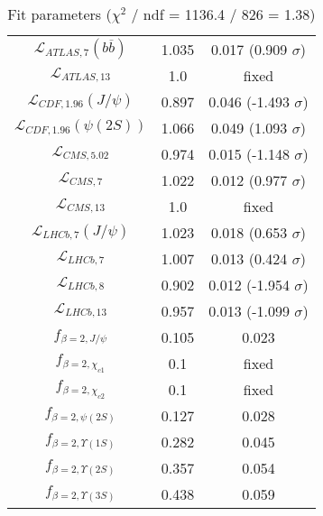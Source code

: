 \begin{table}[h!]
\begin{tabular}{c|c|c}
$\mathcal L_{ATLAS,7}(b\overline b)$ & 1.035 & 0.017 (0.909 $\sigma$) \\
$\mathcal L_{ATLAS,13}$ & 1.0 & fixed \\
$\mathcal L_{CDF,1.96}(J/\psi)$ & 0.897 & 0.046 (-1.493 $\sigma$) \\
$\mathcal L_{CDF,1.96}(\psi(2S))$ & 1.066 & 0.049 (1.093 $\sigma$) \\
$\mathcal L_{CMS,5.02}$ & 0.974 & 0.015 (-1.148 $\sigma$) \\
$\mathcal L_{CMS,7}$ & 1.022 & 0.012 (0.977 $\sigma$) \\
$\mathcal L_{CMS,13}$ & 1.0 & fixed \\
$\mathcal L_{LHCb,7}(J/\psi)$ & 1.023 & 0.018 (0.653 $\sigma$) \\
$\mathcal L_{LHCb,7}$ & 1.007 & 0.013 (0.424 $\sigma$) \\
$\mathcal L_{LHCb,8}$ & 0.902 & 0.012 (-1.954 $\sigma$) \\
$\mathcal L_{LHCb,13}$ & 0.957 & 0.013 (-1.099 $\sigma$) \\
$f_{\beta=2,J/\psi}$ & 0.105 & 0.023 \\
$f_{\beta=2,\chi_{c1}}$ & 0.1 & fixed \\
$f_{\beta=2,\chi_{c2}}$ & 0.1 & fixed \\
$f_{\beta=2,\psi(2S)}$ & 0.127 & 0.028 \\
$f_{\beta=2,\Upsilon(1S)}$ & 0.282 & 0.045 \\
$f_{\beta=2,\Upsilon(2S)}$ & 0.357 & 0.054 \\
$f_{\beta=2,\Upsilon(3S)}$ & 0.438 & 0.059 \\
\end{tabular}
\caption{Fit parameters ($\chi^2$ / ndf = 1136.4 / 826 = 1.38)}
\end{table}
